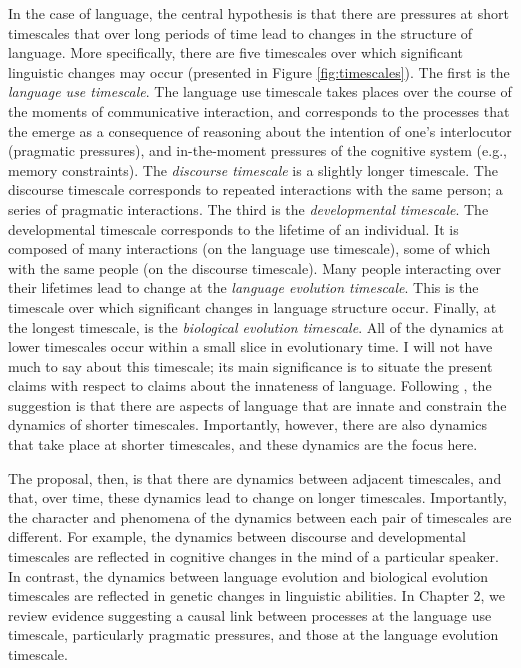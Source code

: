 In the case of language, the central  hypothesis is that there are pressures at  short timescales that over long periods of time lead to changes in the structure of language. More specifically,  there are five timescales over which significant linguistic changes may occur (presented in Figure \ref{fig:timescales}). The first is the {\it language use timescale}. The language use timescale takes places over the course of the moments of communicative interaction, and corresponds to the processes  that the emerge as a consequence of reasoning about the intention of one's interlocutor (pragmatic pressures), and in-the-moment pressures of the cognitive system (e.g., memory constraints).  The {\it discourse timescale} is a slightly longer timescale. The discourse timescale corresponds to repeated interactions with the same person; a series of pragmatic interactions. The third is the {\it developmental timescale}. The developmental timescale corresponds to the lifetime of an individual. It is composed of many interactions (on the language use timescale), some of which with the same people (on the discourse timescale).  Many people interacting over their lifetimes lead to change at the {\it language evolution timescale}. This is the timescale over which significant changes in language structure  occur. Finally, at the longest timescale, is the {\it biological evolution timescale}. All of the dynamics at lower timescales occur within a small slice in evolutionary time. I will not have much to say about this timescale; its main significance is to situate the present claims with respect to claims about the innateness of language. Following , the suggestion is that there are aspects of language that are innate and constrain the dynamics of shorter timescales. Importantly, however, there are also  dynamics that take place at  shorter timescales, and these dynamics are the focus here.




The proposal, then, is that there are dynamics between adjacent timescales, and that, over time, these dynamics lead to change on longer timescales.  Importantly, the character and phenomena of the dynamics between each pair of timescales are different. For example,  the dynamics between discourse and developmental timescales are reflected in cognitive changes in the mind of a particular speaker. In contrast, the dynamics between language evolution and biological evolution timescales are reflected in genetic changes in linguistic abilities. In Chapter 2, we review evidence suggesting a causal link between processes at the language use timescale, particularly pragmatic pressures, and those at the language evolution timescale.

